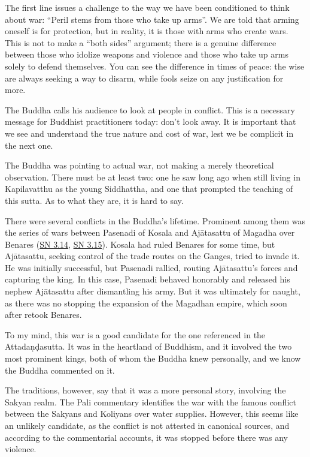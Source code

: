 \documentclass[12pt,openany]{book}%
\begin{document}
The first line issues a challenge to the way we have been conditioned to think about war: “Peril stems from those who take up arms”. We are told that arming oneself is for protection, but in reality, it is those with arms who create wars. This is not to make a “both sides” argument; there is a genuine difference between those who idolize weapons and violence and those who take up arms solely to defend themselves. You can see the difference in times of peace: the wise are always seeking a way to disarm, while fools seize on any justification for more.

The Buddha calls his audience to look at people in conflict. This is a necessary message for Buddhist practitioners today: don’t look away. It is important that we see and understand the true nature and cost of war, lest we be complicit in the next one.

The Buddha was pointing to actual war, not making a merely theoretical observation. There must be at least two: one he saw long ago when still living in Kapilavatthu as the young Siddhattha, and one that prompted the teaching of this sutta. As to what they are, it is hard to say.

There were several conflicts in the Buddha’s lifetime. Prominent among them was the series of wars between Pasenadi of Kosala and \textsanskrit{Ajātasattu} of Magadha over Benares (\href{https://suttacentral.net/sn3.14/en/sujato}{SN 3.14}, \href{https://suttacentral.net/sn3.15/en/sujato}{SN 3.15}). Kosala had ruled Benares for some time, but \textsanskrit{Ajātasattu}, seeking control of the trade routes on the Ganges, tried to invade it. He was initially successful, but Pasenadi rallied, routing \textsanskrit{Ajātasattu}’s forces and capturing the king. In this case, Pasenadi behaved honorably and released his nephew \textsanskrit{Ajātasattu} after dismantling his army. But it was ultimately for naught, as there was no stopping the expansion of the Magadhan empire, which soon after retook Benares.

To my mind, this war is a good candidate for the one referenced in the \textsanskrit{Attadaṇḍasutta}. It was in the heartland of Buddhism, and it involved the two most prominent kings, both of whom the Buddha knew personally, and we know the Buddha commented on it.

The traditions, however, say that it was a more personal story, involving the Sakyan realm. The Pali commentary identifies the war with the famous conflict between the Sakyans and Koliyans over water supplies. However, this seems like an unlikely candidate, as the conflict is not attested in canonical sources, and according to the commentarial accounts, it was stopped before there was any violence.
\end{document}
